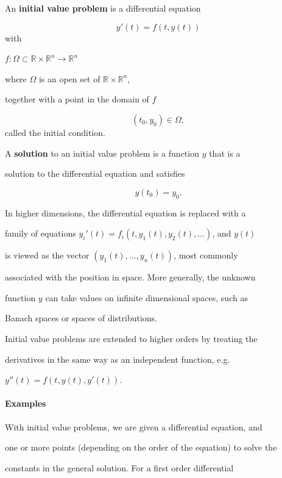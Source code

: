 An \textbf{initial value problem} is a differential equation



$$y'(t) = f(t, y(t))$$ with

$f\colon \Omega \subset \mathbb{R} \times \mathbb{R}^n \to \mathbb{R}^n$

where $\Omega$ is an open set of $\mathbb{R} \times \mathbb{R}^n$,

together with a point in the domain of $f$



$$(t_0, y_0) \in \Omega,$$ called the initial condition.



A \textbf{solution} to an initial value problem is a function $y$ that is a

solution to the differential equation and satisfies



$$y(t_0) = y_0.$$



In higher dimensions, the differential equation is replaced with a

family of equations $y_i'(t)=f_i(t, y_1(t), y_2(t), \dotsc)$, and $y(t)$

is viewed as the vector $(y_1(t), \dotsc, y_n(t))$, most commonly

associated with the position in space. More generally, the unknown

function $y$ can take values on infinite dimensional spaces, such as

Banach spaces or spaces of distributions.



Initial value problems are extended to higher orders by treating the

derivatives in the same way as an independent function, e.g.

$y''(t)=f(t,y(t),y'(t))$.



\paragraph{Examples}



With initial value problems, we are given a differential equation, and

one or more points (depending on the order of the equation) to solve the

constants in the general solution. For a first order differential

